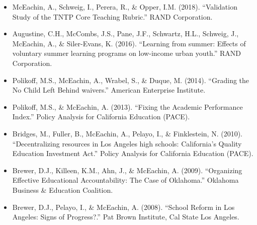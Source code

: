 \documentclass[11pt, letterpaper]{article}
\begin{document}
\begin{itemize}
RAND Corporation. 
  \item McEachin, A., Schweig, I., Perera, R., \& Opper, I.M. (2018).
  ``Validation Study of the TNTP Core Teaching Rubric.''
RAND Corporation. 
  \item Augustine, C.H., McCombs, J.S., Pane, J.F., Schwartz, H.L., Schweig, J., McEachin, A., \& Siler-Evans, K. (2016).
  ``Learning from summer: Effects of voluntary summer learning programs on low-income urban youth.''
RAND Corporation. 
  \item Polikoff, M.S., McEachin, A., Wrabel, S., \& Duque, M. (2014).
  ``Grading the No Child Left Behind waivers.''
American Enterprise Institute. 
  \item Polikoff, M.S., \& McEachin, A. (2013).
  ``Fixing the Academic Performance Index.''
Policy Analysis for California Education (PACE). 
  \item Bridges, M., Fuller, B., McEachin, A., Pelayo, I., \& Finklestein, N. (2010).
  ``Decentralizing resources in Los Angeles high schools: California's Quality Education Investment Act.''
Policy Analysis for California Education (PACE). 
  \item Brewer, D.J., Killeen, K.M., Ahn, J., \& McEachin, A. (2009).
  ``Organizing Effective Educational Accountability: The Case of Oklahoma.''
Oklahoma Business \& Education Coalition. 
  \item Brewer, D.J., Pelayo, I., \& McEachin, A. (2008).
  ``School Reform in Los Angeles: Signs of Progress?.''
Pat Brown Institute, Cal State Los Angeles. 
\end{itemize}

\end{document}
